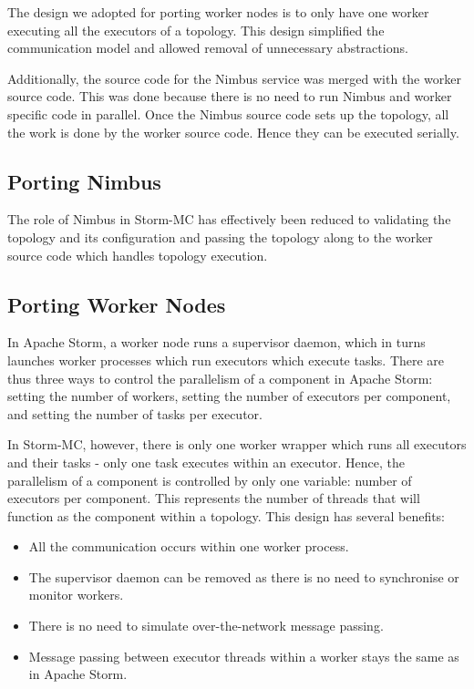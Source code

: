 The design we adopted for porting worker nodes is to only have one worker executing all the executors of a topology. This design simplified the communication model and allowed removal of unnecessary abstractions.

Additionally, the source code for the Nimbus service was merged with the worker source code. This was done because there is no need to run Nimbus and worker specific code in parallel. Once the Nimbus source code sets up the topology, all the work is done by the worker source code. Hence they can be executed serially.

\subsection{Porting Nimbus}

The role of Nimbus in Storm-MC has effectively been reduced to validating the topology and its configuration and passing the topology along to the worker source code which handles topology execution.

\subsection{Porting Worker Nodes}

In Apache Storm, a worker node runs a supervisor daemon, which in turns launches worker processes which run executors which execute tasks. There are thus three ways to control the parallelism of a component in Apache Storm: setting the number of workers, setting the number of executors per component, and setting the number of tasks per executor.

In Storm-MC, however, there is only one worker wrapper which runs all executors and their tasks - only one task executes within an executor. Hence, the parallelism of a component is controlled by only one variable: number of executors per component. This represents the number of threads that will function as the component within a topology. This design has several benefits:

\begin{itemize}
	\item All the communication occurs within one worker process.
	\item The supervisor daemon can be removed as there is no need to synchronise or monitor workers.
	\item There is no need to simulate over-the-network message passing.
	\item Message passing between executor threads within a worker stays the same as in Apache Storm.
\end{itemize}

